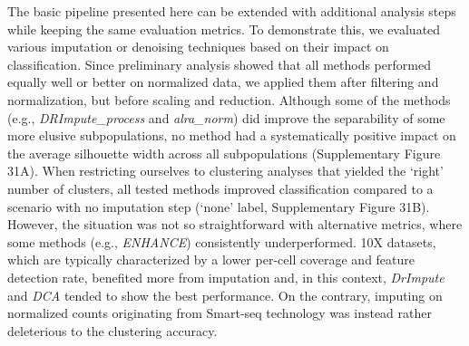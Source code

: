 \documentclass{bmcart}
\begin{document}
The basic pipeline presented here can be extended with additional analysis steps while keeping the same evaluation metrics. To demonstrate this, we evaluated various imputation or denoising techniques based on their impact on classification. Since preliminary analysis showed that all methods performed equally well or better on normalized data, we applied them after filtering and normalization, but before scaling and reduction. Although some of the methods (e.g., \textit{DRImpute\_process} and \textit{alra\_norm}) did improve the separability of some more elusive subpopulations, no method had a systematically positive impact on the average silhouette width across all subpopulations (Supplementary Figure 31A). When restricting ourselves to clustering analyses that yielded the `right' number of clusters, all tested methods improved classification  compared to a scenario with no imputation step (`none' label, Supplementary Figure 31B). However, the situation was not so straightforward with alternative metrics, where some methods (e.g., \textit{ENHANCE}) consistently underperformed. 10X datasets, which are typically characterized by a lower per-cell coverage and feature detection rate, benefited more from imputation and, in this context, \textit{DrImpute} and \textit{DCA} tended to show the best performance. On the contrary, imputing on normalized counts originating from Smart-seq technology was instead rather deleterious to the clustering accuracy. 
\end{document}
